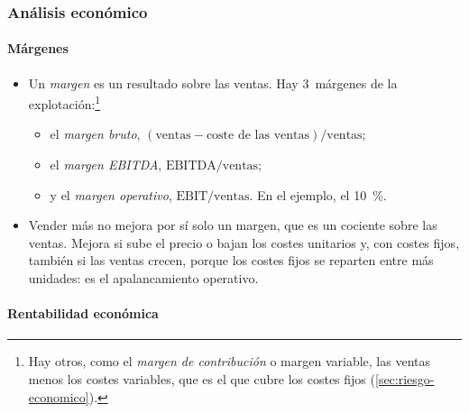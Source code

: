 \documentclass[11pt]{article}
\begin{document}
\subsubsection{Análisis económico}\label{sec:analisis-economico}

\paragraph{Márgenes}

\begin{itemize}
\item Un \emph{margen} es un resultado sobre las ventas. Hay 3~márgenes de la explotación:\footnote{Hay otros, como el \emph{margen de contribución} o margen variable, las ventas menos los costes variables, que es el que cubre los costes fijos (\ref{sec:riesgo-economico}).}
  \begin{itemize}
  \item el \emph{margen bruto}, $(\text{ventas}-\text{coste de las ventas})/\text{ventas}$;
  \item el \emph{margen EBITDA}, $\mathrm{EBITDA}/\text{ventas}$;
  \item y el \emph{margen operativo}, $\mathrm{EBIT}/\text{ventas}$. En el ejemplo, el 10~\%.
  \end{itemize}
\item Vender más no mejora por sí solo un margen, que es un cociente sobre las ventas. Mejora si sube el precio o bajan los costes unitarios y, con costes fijos, también si las ventas crecen, porque los costes fijos se reparten entre más unidades: es el apalancamiento operativo.
\end{itemize}

\paragraph{Rentabilidad económica}
\end{document}
